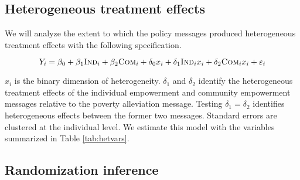 \documentclass[11pt, a4paper]{article}\usepackage[]{graphicx}\usepackage[]{color}
\begin{document}
    \subsection{Heterogeneous treatment effects}

        We will analyze the extent to which the policy messages produced heterogeneous treatment effects with the following specification.

        \begin{equation}
            Y_{i} = \beta_{0} + \beta_{1}\text{\textsc{Ind}}_{i} + \beta_{2}\text{\textsc{Com}}_{i} + \delta_{0} x_i + \delta_{1}\text{\textsc{Ind}}_{i} x_i + \delta_{2}\text{\textsc{Com}}_{i} x_i + \varepsilon_{i}
        \label{eq:heteffect} \end{equation}

        $x_{i}$ is the binary dimension of heterogeneity. $\delta_{1}$ and $\delta_{2}$ identify the heterogeneous treatment effects of the individual empowerment and community empowerment messages relative to the poverty alleviation message. Testing $\delta_{1} = \delta_{2}$ identifies heterogeneous effects between the former two messages. Standard errors are clustered at the individual level. We estimate this model with the  variables summarized in Table \ref{tab:hetvars}.

        \begin{table}[h]
        \centering
        \caption{Dimensions of heterogeneity}
        \label{tab:hetvars}
        \end{table}

    \subsection{Randomization inference}
\end{document}
